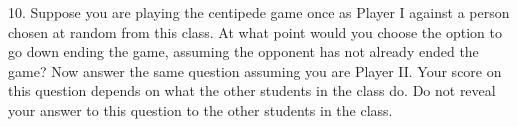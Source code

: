 \documentclass{article}
\begin{document}
10. Suppose you are playing the centipede game once as Player I against a person
chosen at random from this class. At what point would you choose the option to go down
ending the game, assuming the opponent has not already ended the game?
Now answer the same question assuming you are Player II.
Your score on this question depends on what the other students in the class do. Do
not reveal your answer to this question to the other students in the class.
\end{document}
